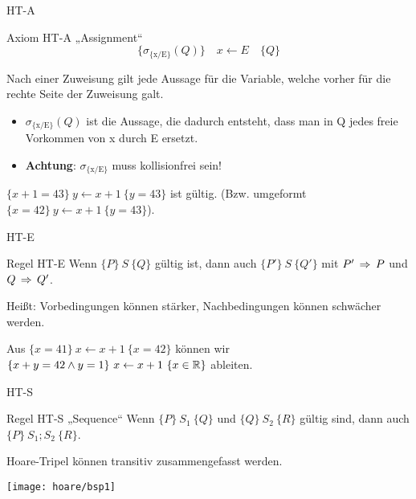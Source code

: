 \begin{frame}{HT-A}
	\begin{block} {Axiom HT-A \quad „Assignment“}
		$$ \{\sigma_{\{\text{x/E}\}} (Q)\} \quad x \leftarrow E \quad \{Q\} $$
	\end{block}
	\pause
	Nach einer Zuweisung gilt jede Aussage für die Variable, welche vorher für die rechte Seite der Zuweisung galt.
	\begin{itemize}
		\item $\sigma_{\{\text{x/E}\}} (Q) $ ist die Aussage, die dadurch entsteht, dass man in Q jedes freie Vorkommen von x durch E ersetzt.
		\item \textbf{Achtung}: $\sigma_{\{\text{x/E}\}}$ muss kollisionfrei sein!
	\end{itemize}
	
	\begin{Beispiel}
		$\{ x + 1 = 43\} \ y \gets x + 1\ \{y = 43 \}$ ist gültig. \pause (Bzw. umgeformt \\
		$\{ x = 42 \} \ y \gets x + 1\ \{y = 43 \}$).
	\end{Beispiel}
	
\end{frame}

\begin{frame}{HT-E}
	\begin{block}{Regel HT-E}
		Wenn $\{P\}\ S\ \{Q\}$ gültig ist, dann auch $\{P'\}\ S\ \{Q'\}$ mit $P' \impl P$ und $Q \impl  Q'$.
	\end{block}
	\pause
	Heißt: Vorbedingungen können stärker, Nachbedingungen können schwächer werden.

	\begin{Beispiel}
		Aus $\{ x = 41\} \ x \gets x + 1\ \{x = 42 \}$ können wir \\
		$\{ x + y = 42 \land y = 1 \} \ x \gets x + 1\ \{x \in \R \}$ ableiten.
	\end{Beispiel}
\end{frame}

\begin{frame}{HT-S}
	\begin{block}{Regel HT-S \quad „Sequence“}
		Wenn $\{P\}\ S_1\ \{Q\}$ und $\{Q\}\ S_2\ \{R\}$ gültig sind, dann auch $\{P\}\ S_1;  S_2\ \{R\}$. 
	\end{block}
	\pause
	\impl Hoare-Tripel können transitiv zusammengefasst werden.
\end{frame}

\begin{frame}
	\texttt{[image: hoare/bsp1]}
\end{frame}

